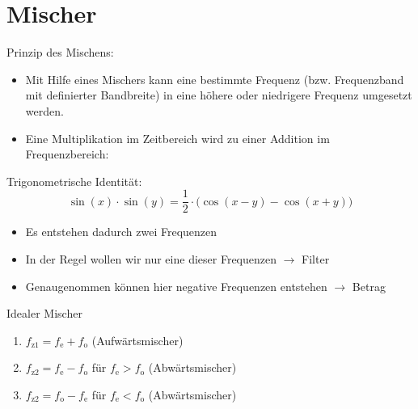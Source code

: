 \section{Mischer}

\begin{frame}{Prinzip des Mischens:}

    \begin{itemize}
        \item Mit Hilfe eines Mischers kann eine bestimmte Frequenz (bzw.
        Frequenzband mit definierter Bandbreite) in eine höhere oder niedrigere
        Frequenz umgesetzt werden.
        \item Eine Multiplikation im Zeitbereich wird zu einer Addition im
        Frequenzbereich:
    \end{itemize}
    \begin{block}{Trigonometrische Identität:}
        $$ \sin(x) \cdot \sin(y) = \frac{1}{2} \cdot \Big( \cos(x-y) - \cos(x+y) \Big) $$
    \end{block}
    \begin{itemize}
        \item Es entstehen dadurch zwei Frequenzen
        \item In der Regel wollen wir nur eine dieser Frequenzen $\rightarrow$ Filter
        \item Genaugenommen können hier negative Frequenzen entstehen $\rightarrow$ Betrag
    \end{itemize}
\end{frame}

\begin{frame}{Idealer Mischer}

    \begin{enumerate}
        \item[1.]<3-> $f_\text{z1} = f_\text{e} + f_\text{o}$ (Aufwärtsmischer)
        \item[2a.]<4-> $f_\text{z2} = f_\text{e} - f_\text{o}$ für $f_\text{e} > f_\text{o}$ (Abwärtsmischer)
        \item[2b.]<5-> $f_\text{z2} = f_\text{o} - f_\text{e}$ für $f_\text{e} < f_\text{o}$ (Abwärtsmischer)
    \end{enumerate}
    \vspace{10pt}
\end{frame}

